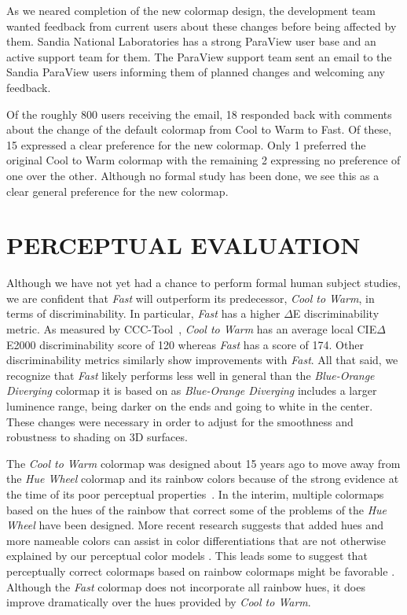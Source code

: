 \documentclass{IEEEcsmag}
\newcommand*{\colormap}[1]{\textsl{#1}\xspace}
\newcommand*{\huewheel}{\colormap{Hue Wheel}}
\newcommand*{\coolwarm}{\colormap{Cool to Warm}}
\newcommand*{\blueorange}{\colormap{Blue-Orange Diverging}}
\newcommand*{\fast}{\colormap{Fast}}
\begin{document}
As we neared completion of the new colormap design, the development team wanted feedback from current users about these changes before being affected by them.
Sandia National Laboratories has a strong ParaView user base and an active support team for them.
The ParaView support team sent an email to the Sandia ParaView users informing them of planned changes and welcoming any feedback.

Of the roughly 800 users receiving the email, 18 responded back with comments about the change of the default colormap from Cool to Warm to Fast.
Of these, 15 expressed a clear preference for the new colormap.
Only 1 preferred the original Cool to Warm colormap with the remaining 2 expressing no preference of one over the other.
Although no formal study has been done, we see this as a clear general preference for the new colormap.


\section{PERCEPTUAL EVALUATION}

Although we have not yet had a chance to perform formal human subject studies, we are confident that \fast will outperform its predecessor, \coolwarm, in terms of discriminability.
In particular, \fast has a higher $\Delta$E discriminability metric.
As measured by CCC-Tool~\cite{Nardini2021}, \coolwarm has an average local CIE$\Delta$E2000 discriminability score of 120 whereas \fast has a score of 174. Other discriminability metrics similarly show improvements with \fast.
All that said, we recognize that \fast%
likely performs less well in general than the \blueorange colormap it is based on as \blueorange includes a larger luminence range, being darker on the ends and going to white in the center.
These changes were necessary in order to adjust for the smoothness and robustness to shading on 3D surfaces.

The \coolwarm colormap was designed about 15 years ago to move away from the \huewheel colormap and its rainbow colors because of the strong evidence at the time of its poor perceptual properties~\cite{Rogowitz1998,Borland2007,Ware1988,Light2004}.
In the interim, multiple colormaps based on the hues of the rainbow that correct some of the problems of the \huewheel have been designed.
More recent research suggests that added hues and more nameable colors can assist in color differentiations that are not otherwise explained by our perceptual color models \cite{Reda2021}.
This leads some to suggest that perceptually correct colormaps based on rainbow colormaps might be favorable \cite{Ware2023}.
Although the \fast colormap does not incorporate all rainbow hues, it does improve dramatically over the hues provided by \coolwarm. 
\end{document}
